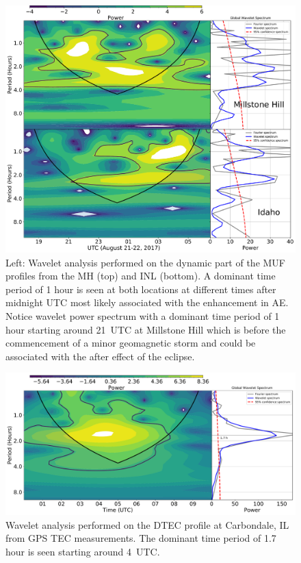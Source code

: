 \documentclass[crop=false,class=mitthesis,oneside,font=12pt]{standalone}
\begin{document}
\begin{figure}[H]
\centering\includegraphics[width=35pc]{muf_digi_wavelet.pdf}
\caption{Left: Wavelet analysis performed on the dynamic part of the MUF profiles from the MH (top) and  INL (bottom). A dominant time period of 1 hour is seen at both locations at different times after midnight UTC most likely associated with the enhancement in AE. Notice wavelet power spectrum with a dominant time period of 1 hour starting around 21~UTC at Millstone Hill which is before the commencement of a minor geomagnetic storm and could be associated with the after effect of the eclipse. }
\label{fig:muf_wv}
\end{figure}
 
\begin{figure}[H]
\centering\includegraphics[width=35pc]{dtec.pdf}
\caption{Wavelet analysis performed on the DTEC profile at Carbondale, IL from GPS TEC measurements.  The dominant time period of 1.7 hour is seen starting around 4~UTC.}
\label{fig:wav_tec}
\end{figure} 
 
\end{document}
